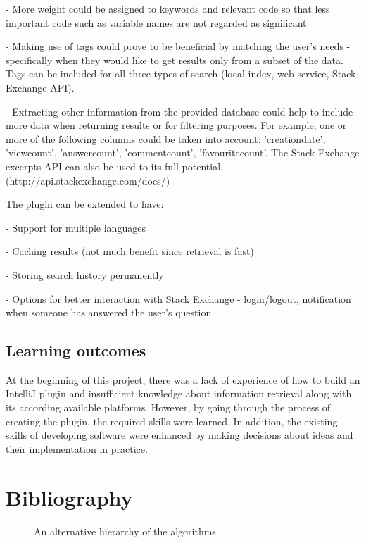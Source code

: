 \documentclass{l4proj}
\begin{document}
- More weight could be assigned to keywords and relevant code so that less important code such as variable names are not regarded as significant. 

- Making use of tags could prove to be beneficial by matching the user's needs - specifically when they would like to get results only from a subset of the data. Tags can be included for all three types of search (local index, web service, Stack Exchange API).

- Extracting other information from the provided database could help to include more data when returning results or for filtering purposes. For example, one or more of the following columns could be taken into account: 'creationdate', 'viewcount', 'answercount', 'commentcount', 'favouritecount'. The Stack Exchange excerpts API can also be used to its full potential. (http://api.stackexchange.com/docs/)

The plugin can be extended to have:

- Support for multiple languages

- Caching results (not much benefit since retrieval is fast)

- Storing search history permanently

- Options for better interaction with Stack Exchange - login/logout, notification when someone has answered the user's question

\section{Learning outcomes}

At the beginning of this project, there was a lack of experience of how to build an IntelliJ plugin and insufficient knowledge about information retrieval along with its according available platforms. However, by going through the process of creating the plugin, the required skills were learned. In addition, the existing skills of developing software were enhanced by making decisions about ideas and their implementation in practice.

\chapter{Bibliography}

\begin{figure}
\centering
\vspace{-30mm}
\caption{An alternative hierarchy of the algorithms.}
\label{uroborus}
\end{figure}
\end{document}
